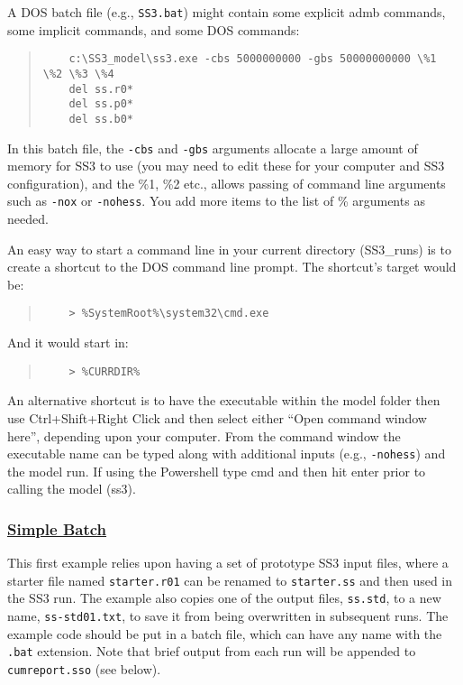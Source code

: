 A DOS batch file (e.g., \texttt{SS3.bat}) might contain some explicit \gls{admb} commands, some implicit commands, and some DOS commands:

\begin{quote}
	\begin{verbatim}
	c:\SS3_model\ss3.exe -cbs 5000000000 -gbs 50000000000 \%1 \%2 \%3 \%4 
	del ss.r0*
	del ss.p0*
	del ss.b0*
	\end{verbatim}
\end{quote}


In this batch file, the \texttt{-cbs} and \texttt{-gbs} arguments allocate a large amount of memory for SS3 to use (you may need to edit these for your computer and SS3 configuration), and the \%1, \%2 etc., allows passing of command line arguments such as \texttt{-nox} or \texttt{-nohess}. You add more items to the list of \% arguments as needed.

An easy way to start a command line in your current directory (SS3\_runs) is to create a shortcut to the DOS command line prompt. The shortcut's target would be:

\begin{quote}
	\begin{verbatim}
	> %SystemRoot%\system32\cmd.exe
	\end{verbatim}
\end{quote}


\noindent And it would start in:
\begin{quote}
	\begin{verbatim}
	> %CURRDIR%
	\end{verbatim}
\end{quote}

An alternative shortcut is to have the executable within the model folder then use Ctrl+Shift+Right Click and then select either ``Open command window here'', depending upon your computer. From the command window the executable name can be typed along with additional inputs (e.g., \texttt{-nohess}) and the model run. If using the Powershell type cmd and then hit enter prior to calling the model (ss3). 

\hypertarget{SimpleBatch}{}
\subsubsection[Simple Batch]{\protect\hyperlink{SimpleBatch}{Simple Batch}}

This first example relies upon having a set of prototype SS3 input files, where a starter file named \texttt{starter.r01} can be renamed to \texttt{starter.ss} and then used in the SS3 run. The example also copies one of the output files, \texttt{ss.std}, to a new name, \texttt{ss-std01.txt}, to save it from being overwritten in subsequent runs. The example code should be put in a batch file, which can have any name with the \texttt{.bat} extension. Note that brief output from each run will be appended to \texttt{cumreport.sso} (see below).

